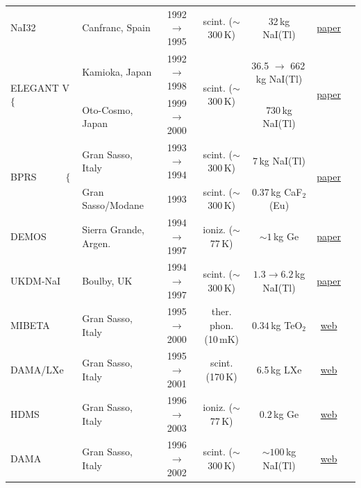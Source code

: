 \begin{table}
{\begin{tabular}{llccccc}
{\sc NaI32} & Canfranc, Spain & 1992 $\to$ 1995 & scint. ($\sim$300\,K)   &  32\,kg NaI(Tl) & \href{https://doi.org/10.1016/0920-5632(96)00211-3}{paper} & \cite{Sarsa:1995yb}
\\

\multirow{2}{*}{{\sc ELEGANT V $\Big\{$}} & Kamioka, Japan & 1992 $\to$ 1998 & \multirow{2}{*}{scint. ($\sim$300\,K)}  &  36.5 $\to$ 662\,kg NaI(Tl) & \multirow{2}{*}{\href{https://doi.org/10.1016/S0927-6505(99)00086-9}{paper}} & \multirow{2}{*}{\cite{ELEGANTV}}
\\

 & Oto-Cosmo, Japan & 1999 $\to$ 2000 &   &  730\,kg NaI(Tl) &  & 
\\

\multirow{2}{*}{{\sc BPRS}~~~~~~$\Big\{$} & Gran Sasso, Italy & 1993 $\to$ 1994 & scint. ($\sim$300\,K)  &  7\,kg NaI(Tl) & \multirow{2}{*}{\href{https://www.sciencedirect.com/science/article/abs/pii/092056329500470T}{paper} }& \multirow{2}{*}{\cite{BPRS}}
\\

 & Gran Sasso/Modane & 1993 & scint. ($\sim$300\,K)  &  0.37\,kg CaF${}_2$(Eu) & & 
\\

{\sc DEMOS} & Sierra Grande, Argen. & 1994 $\to$ 1997 & ioniz. ($\sim$77\,K)   &  $\sim1\,$kg Ge & \href{https://doi.org/10.1016/S0927-6505(98)00047-4}{paper} & \cite{DEMOS}
\\

{\sc UKDM-NaI} & Boulby, UK & 1994 $\to$ 1997 & scint. ($\sim$300\,K)  &  $1.3\to6.2$\,kg NaI(Tl) & \href{https://doi.org/10.1016/0370-2693(96)00350-4}{paper} & \cite{UKDMC-NaI}
\\

{\sc MIBETA} & Gran Sasso, Italy & 1995 $\to$ 2000 &  ther. phon. (10\,mK) &  $0.34$\,kg TeO${}_2$ & \href{http://www.nu.to.infn.it/exp/all/mibeta/}{web} & \cite{MIBETA}
\\

{\sc DAMA/LXe} & Gran Sasso, Italy & 1995 $\to$ 2001 & scint. (170\,K)  &  6.5\,kg LXe & \href{https://dama.web.roma2.infn.it/?page_id=84}{web} & \cite{DAMA-Xe}
\\

{\sc HDMS} & Gran Sasso, Italy & 1996 $\to$ 2003 & ioniz. ($\sim$77\,K) & $0.2$\,kg Ge & \href{http://www.klapdor-k.de/Theory\%20of\%20Experiments/DarkMatter/Recent\%20Results.htm}{web} & \cite{HDMS}
\\

{\sc DAMA} & Gran Sasso, Italy & 1996 $\to$ 2002 & scint. ($\sim$300\,K)  &  $\sim100\,$kg NaI(Tl) &  \href{http://people.roma2.infn.it/~dama/web/ind_nai.html}{web} & \cite{DAMA}
\\


\end{tabular}}
\end{table}
